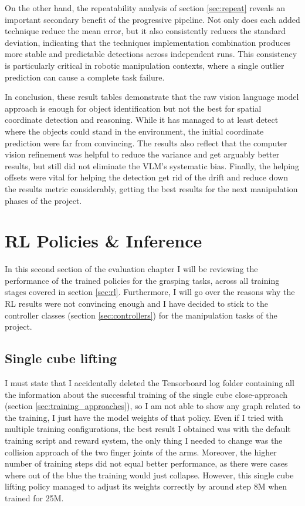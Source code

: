 On the other hand, the repeatability analysis of section \ref{sec:repeat} reveals an important secondary benefit of the progressive pipeline. Not only does each added technique reduce the mean error, but it also consistently reduces the standard deviation, indicating that the techniques implementation combination produces more stable and predictable detections across independent runs. This consistency is particularly critical in robotic manipulation contexts, where a single outlier prediction can cause a complete task failure.

In conclusion, these result tables demonstrate that the raw vision language model approach is enough for object identification but not the best for spatial coordinate detection and reasoning. While it has managed to at least detect where the objects could stand in the environment, the initial coordinate prediction were far from convincing. The results also reflect that the computer vision refinement was helpful to reduce the variance and get arguably better results, but still did not eliminate the VLM's systematic bias. Finally, the helping offsets were vital for helping the detection get rid of the drift and reduce down the results metric considerably, getting the best results for the next manipulation phases of the project. 


\section{RL Policies \& Inference}
In this second section of the evaluation chapter I will be reviewing the performance of the trained policies for the grasping tasks, across all training stages covered in section \ref{sec:rl}. Furthermore, I will go over the reasons why the RL results were not convincing enough and I have decided to stick to the controller classes (section \ref{sec:controllers}) for the manipulation tasks of the project. 

\subsection{Single cube lifting}
I must state that I accidentally deleted the Tensorboard log folder containing all the information about the successful training of the single cube close-approach (section \ref{sec:training_approaches}), so I am not able to show any graph related to the training, I just have the model weights of that policy. Even if I tried with multiple training configurations, the best result I obtained was with the default training script and reward system, the only thing I needed to change was the collision approach of the two finger joints of the arms. Moreover, the higher number of training steps did not equal better performance, as there were cases where out of the blue the training would just collapse. However, this single cube lifting policy managed to adjust its weights correctly by around step 8M when trained for 25M.

